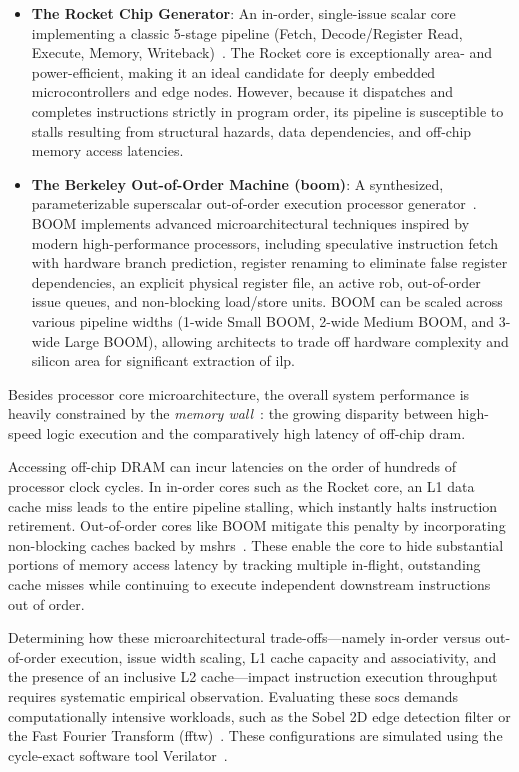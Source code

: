 \begin{itemize}
    \item \textbf{The Rocket Chip Generator}: An in-order, single-issue scalar core implementing a classic 5-stage pipeline
      (Fetch, Decode/Register Read, Execute, Memory, Writeback)~\cite{asanovic2016rocket}. 
      The Rocket core is exceptionally area- and power-efficient, making it an ideal candidate for deeply embedded microcontrollers and edge nodes. 
      However, because it dispatches and completes instructions strictly in program order, its pipeline is susceptible to stalls resulting from structural hazards, data dependencies, 
      and off-chip memory access latencies.
    \item \textbf{The Berkeley Out-of-Order Machine (\gls{boom})}: A synthesized, parameterizable superscalar out-of-order execution processor generator~\cite{celio2015boom,celio2019boomv2}. 
      BOOM implements advanced microarchitectural techniques inspired by modern high-performance processors, including speculative instruction fetch with hardware branch prediction, 
      register renaming to eliminate false register dependencies, an explicit physical register file, an active \gls{rob}, out-of-order issue queues, and non-blocking load/store units. 
      BOOM can be scaled across various pipeline widths (1-wide Small BOOM, 2-wide Medium BOOM, and 3-wide Large BOOM), 
      allowing architects to trade off hardware complexity and silicon area for significant extraction of \gls{ilp}.
\end{itemize}

Besides processor core microarchitecture,
the overall system performance is heavily constrained by the \emph{memory wall}~\cite{wulf1995memory}:
the growing disparity between high-speed logic execution and the comparatively high latency of off-chip \gls{dram}.

Accessing off-chip DRAM can incur latencies on the order of hundreds of processor clock cycles.
In in-order cores such as the Rocket core, an L1 data cache miss leads to the entire pipeline stalling, which instantly halts instruction retirement.
Out-of-order cores like BOOM mitigate this penalty by incorporating non-blocking caches backed by \glspl{mshr}~\cite{kroft1981lockup}.
These enable the core to hide substantial portions of memory access latency by tracking multiple in-flight, 
outstanding cache misses while continuing to execute independent downstream instructions out of order.

Determining how these microarchitectural trade-offs---namely in-order versus out-of-order execution, issue width scaling, L1 cache capacity and associativity, 
and the presence of an inclusive L2 cache---impact instruction execution throughput requires systematic empirical observation.
Evaluating these \glspl{soc} demands computationally intensive workloads, such as the Sobel 2D edge detection filter or the Fast Fourier Transform (\gls{fftw})~\cite{frigo2005design}. 
These configurations are simulated using the cycle-exact software tool Verilator~\cite{snyder2004verilator}.

